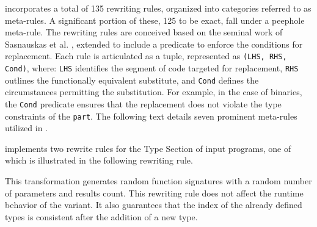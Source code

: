 





\tool incorporates a total of 135 rewriting rules, organized into categories referred to as meta-rules. 
A significant portion of these, 125 to be exact, fall under a peephole meta-rule.
The rewriting rules are conceived based on the seminal work of Sasnauskas et al. \cite{2017arXiv171104422S}, extended to include a predicate to enforce the conditions for replacement. 
Each rule is articulated as a tuple, represented as \texttt{(LHS, RHS, Cond)}, where: \texttt{LHS} identifies the segment of code targeted for replacement, \texttt{RHS} outlines the functionally equivalent substitute, and \texttt{Cond} defines the circumstances permitting the substitution.
For example, in the case of \Wasm binaries, the \texttt{Cond} predicate ensures that the replacement does not violate the type constraints of the \texttt{part}. 
The following text details seven prominent meta-rules utilized in \tool.


%


\tool implements two rewrite rules for the Type Section of input \Wasm programs, one of which is illustrated in the following rewriting rule. 



This transformation generates random function signatures with a random number of parameters and results count.
This rewriting rule does not affect the runtime behavior of the  variant.
It also guarantees that the index of the already defined types is consistent after the addition of a new type. 

